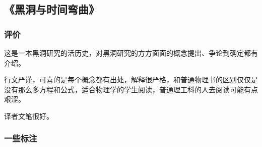 \subsection{《黑洞与时间弯曲》}

\subsubsection{评价}

这是一本黑洞研究的活历史，对黑洞研究的方方面面的概念提出、争论到确定都有介绍。

行文严谨，可喜的是每个概念都有出处，解释很严格，和普通物理书的区别仅仅是没有那么多方程和公式，适合物理学的学生阅读，普通理工科的人去阅读可能有点艰涩。

译者文笔很好。

\subsubsection{一些标注}
